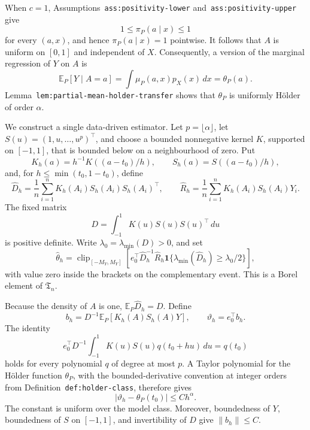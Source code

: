 When \(c=1\), Assumptions~\texttt{ass:positivity-lower} and~\texttt{ass:positivity-upper} give
\[
1\le \pi_P(a\mid x)\le 1
\]
for every \((a,x)\), and hence \(\pi_P(a\mid x)=1\) pointwise. It follows that \(A\) is uniform on \([0,1]\) and independent of \(X\). Consequently, a version of the marginal regression of \(Y\) on \(A\) is
\[
\mathbb E_P[Y\mid A=a]
=
\int \mu_P(a,x)p_X(x)\,dx
=
\theta_P(a).
\]
Lemma~\texttt{lem:partial-mean-holder-transfer} shows that \(\theta_P\) is uniformly H\"older of order \(\alpha\).

We construct a single data-driven estimator. Let \(p=\lfloor\alpha\rfloor\), let \(S(u)=(1,u,\ldots,u^p)^\top\), and choose a bounded nonnegative kernel \(K\), supported on \([-1,1]\), that is bounded below on a neighbourhood of zero. Put
\[
K_h(a)=h^{-1}K((a-t_0)/h),
\qquad
S_h(a)=S((a-t_0)/h),
\]
and, for \(h\le \min(t_0,1-t_0)\), define
\[
\widehat D_h=\frac1n\sum_{i=1}^nK_h(A_i)S_h(A_i)S_h(A_i)^\top,
\qquad
\widehat R_h=\frac1n\sum_{i=1}^nK_h(A_i)S_h(A_i)Y_i.
\]
The fixed matrix
\[
D=\int_{-1}^1K(u)S(u)S(u)^\top\,du
\]
is positive definite. Write \(\lambda_0=\lambda_{\min}(D)>0\), and set
\[
\widehat\theta_h
=
\operatorname{clip}_{[-M_Y,M_Y]}
\left[
 e_0^\top\widehat D_h^{-1}\widehat R_h
 \mathbf 1\{\lambda_{\min}(\widehat D_h)\ge\lambda_0/2\}
\right],
\]
with value zero inside the brackets on the complementary event. This is a Borel element of \(\mathfrak T_n\).

Because the density of \(A\) is one, \(\mathbb E_P\widehat D_h=D\). Define
\[
b_h=D^{-1}\mathbb E_P[K_h(A)S_h(A)Y],
\qquad
\vartheta_h=e_0^\top b_h.
\]
The identity
\[
e_0^\top D^{-1}
\int_{-1}^1K(u)S(u)q(t_0+hu)\,du=q(t_0)
\]
holds for every polynomial \(q\) of degree at most \(p\). A Taylor polynomial for the H\"older function \(\theta_P\), with the bounded-derivative convention at integer orders from Definition~\texttt{def:holder-class}, therefore gives
\[
\lvert\vartheta_h-\theta_P(t_0)\rvert\le C h^\alpha.
\]
The constant is uniform over the model class. Moreover, boundedness of \(Y\), boundedness of \(S\) on \([-1,1]\), and invertibility of \(D\) give \(\lVert b_h\rVert\le C\).

